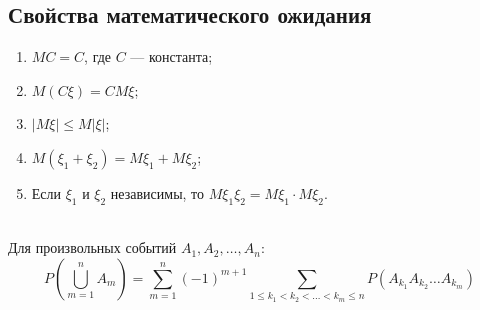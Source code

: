 \subsection{Свойства математического ожидания}
\begin{enumerate}
    \item $MC = C$, где $C$ --- константа;
    \item $M(C\xi) = CM\xi$;
    \item $|M\xi| \le M|\xi|$;
    \item $M(\xi_1 + \xi_2) = M\xi_1 + M\xi_2$;
    \item Если $\xi_1$ и $\xi_2$ независимы, то $M\xi_1\xi_2 = M\xi_1 \cdot M\xi_2$.
\end{enumerate}
\ \\
Для произвольных событий $A_1, A_2,\ldots, A_n$:
\begin{equation*}
    P(\bigcup_{m=1}^n A_m) = \sum_{m=1}^n (-1)^{m+1} \sum_{1 \le k_1 < k_2 < \ldots < k_m \le n} P(A_{k_1} A_{k_2} \ldots A_{k_m})
\end{equation*}

